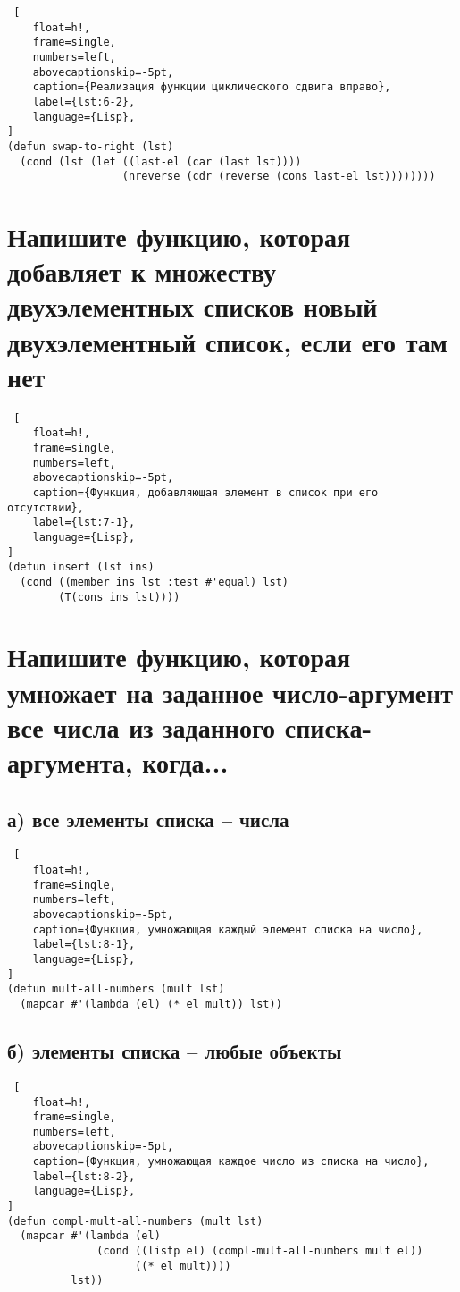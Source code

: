 \begin{lstlisting} [
	float=h!,
	frame=single,
	numbers=left,
	abovecaptionskip=-5pt,
	caption={Реализация функции циклического сдвига вправо},
	label={lst:6-2},
	language={Lisp},
]
(defun swap-to-right (lst)
  (cond (lst (let ((last-el (car (last lst))))
                  (nreverse (cdr (reverse (cons last-el lst))))))))
\end{lstlisting}

\section{Напишите функцию, которая добавляет к множеству двухэлементных списков новый двухэлементный список, если его там нет}

\begin{lstlisting} [
	float=h!,
	frame=single,
	numbers=left,
	abovecaptionskip=-5pt,
	caption={Функция, добавляющая элемент в список при его отсутствии},
	label={lst:7-1},
	language={Lisp},
]
(defun insert (lst ins)
  (cond ((member ins lst :test #'equal) lst)
        (T(cons ins lst))))
\end{lstlisting}

\section{Напишите функцию, которая умножает на заданное число-аргумент все числа из заданного списка-аргумента, когда...}

\subsection{а) все элементы списка -- числа}

\begin{lstlisting} [
	float=h!,
	frame=single,
	numbers=left,
	abovecaptionskip=-5pt,
	caption={Функция, умножающая каждый элемент списка на число},
	label={lst:8-1},
	language={Lisp},
]
(defun mult-all-numbers (mult lst)
  (mapcar #'(lambda (el) (* el mult)) lst))
\end{lstlisting}

\subsection{б) элементы списка -- любые объекты}

\begin{lstlisting} [
	float=h!,
	frame=single,
	numbers=left,
	abovecaptionskip=-5pt,
	caption={Функция, умножающая каждое число из списка на число},
	label={lst:8-2},
	language={Lisp},
]
(defun compl-mult-all-numbers (mult lst)
  (mapcar #'(lambda (el)
              (cond ((listp el) (compl-mult-all-numbers mult el))
                    ((* el mult))))
          lst)) \end{lstlisting}

